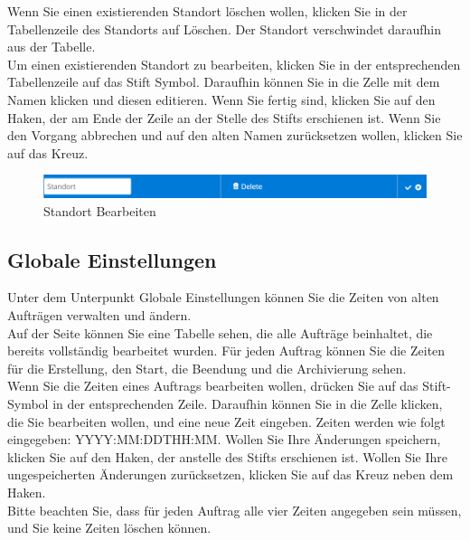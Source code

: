 \documentclass[enabledeprecatedfontcommands,fontsize=12pt,paper=a4,twoside]{scrartcl}
\begin{document}
Wenn Sie einen existierenden Standort löschen wollen, klicken Sie in der Tabellenzeile des Standorts auf Löschen. Der Standort verschwindet daraufhin aus der Tabelle. \\

Um einen existierenden Standort zu bearbeiten, klicken Sie in der entsprechenden Tabellenzeile auf das Stift Symbol. Daraufhin können Sie in die Zelle mit dem Namen klicken und diesen editieren. Wenn Sie fertig sind, klicken Sie auf den Haken, der am Ende der Zeile an der Stelle des Stifts erschienen ist. Wenn Sie den Vorgang abbrechen und auf den alten Namen zurücksetzen wollen, klicken Sie auf das Kreuz. \\

\begin{figure}[h!]
\begin{center}
 \includegraphics[width=\textwidth]{screenshots/admin/standortbearbeiten.png}
  \caption{Standort Bearbeiten}
  \label{fig:boat2}
\end{center}
\end{figure}


\subsection{Globale Einstellungen}
Unter dem Unterpunkt Globale Einstellungen können Sie die Zeiten von alten Aufträgen verwalten und ändern. \\
Auf der Seite können Sie eine Tabelle sehen, die alle Aufträge beinhaltet, die bereits vollständig bearbeitet wurden. Für jeden Auftrag können Sie die Zeiten für die Erstellung, den Start, die Beendung und die Archivierung sehen. \\
Wenn Sie die Zeiten eines Auftrags bearbeiten wollen, drücken Sie auf das Stift-Symbol in der entsprechenden Zeile. Daraufhin können Sie in die Zelle klicken, die Sie bearbeiten wollen, und eine neue Zeit eingeben. Zeiten werden wie folgt eingegeben: YYYY:MM:DDTHH:MM. 
Wollen Sie Ihre Änderungen speichern, klicken Sie auf den Haken, der anstelle des Stifts erschienen ist. Wollen Sie Ihre ungespeicherten Änderungen zurücksetzen, klicken Sie auf das Kreuz neben dem Haken. \\
Bitte beachten Sie, dass für jeden Auftrag alle vier Zeiten angegeben sein müssen, und Sie keine Zeiten löschen können. \\
\end{document}
